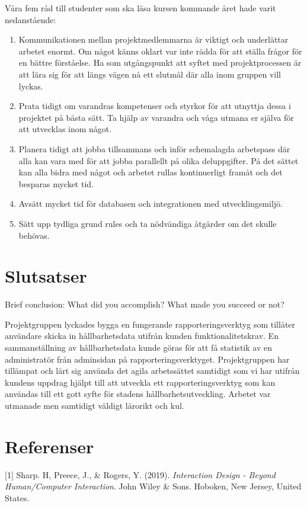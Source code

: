 \documentclass[12pt]{article}
\begin{document}
Våra fem råd till studenter som ska läsa kursen kommande året hade varit nedanstående:
\begin{enumerate}

\item  Kommunikationen mellan projektmedlemmarna är viktigt och underlättar arbetet enormt. Om något känns oklart var inte rädda för att ställa frågor för en bättre förståelse. Ha som utgångspunkt att syftet med projektprocessen är att lära sig för att längs vägen nå ett slutmål där alla inom gruppen vill lyckas.
\item Prata tidigt om varandras kompetenser och styrkor för att utnyttja dessa i projektet på bästa sätt. Ta hjälp av varandra och våga utmana er själva för att utvecklas inom något. 
\item  Planera tidigt att jobba tillsammans och inför schemalagda arbetspass där alla kan vara med för att jobba parallellt på olika deluppgifter. På det sättet kan alla bidra med något och arbetet rullas kontinuerligt framåt och det besparas mycket tid. 
\item  Avsätt mycket tid för databasen och integrationen med utvecklingsmiljö. 
\item  Sätt upp tydliga grund rules och ta nödvändiga åtgärder om det skulle behövas.        
\end{enumerate}

\section{Slutsatser}
Brief conclusion: What did you accomplish? What made you succeed or not? 

Projektgruppen lyckades bygga en fungerande rapporteringsverktyg som tillåter användare skicka in hållbarhetsdata utifrån kunden funktionalitetskrav. En sammanställning av hållbarhetsdata kunde göras för att få statistik av en administratör från adminsidan på rapporteringsverktyget. Projektgruppen har tillämpat och lärt sig använda det agila arbetssättet samtidigt som vi har utifrån kundens uppdrag hjälpt till att utveckla ett  rapporteringsverktyg som kan användas till ett gott syfte för stadens hållbarhetsutveckling. Arbetet var utmanade men samtidigt väldigt lärorikt och kul. 

\section{Referenser}
[1] Sharp. H, Preece, J., \& Rogers, Y. (2019). \textit{Interaction Design - Beyond Human/Computer Interaction}. John Wiley \& Sons. Hoboken, New Jersey, United States. \\
\end{document}
